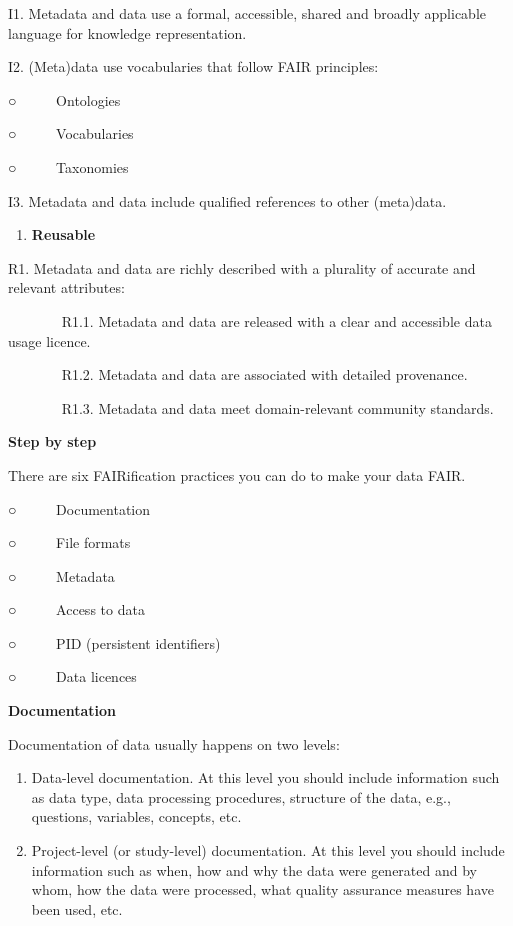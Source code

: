 \documentclass[
]{book}
\providecommand{\tightlist}{%
  \setlength{\itemsep}{0pt}\setlength{\parskip}{0pt}}
\begin{document}
I1. Metadata and data use a formal, accessible, shared and broadly applicable language for knowledge representation.

I2. (Meta)data use vocabularies that follow FAIR principles:

○ ~ ~ ~ Ontologies

○ ~ ~ ~ Vocabularies

○ ~ ~ ~ Taxonomies

I3. Metadata and data include qualified references to other (meta)data.

\begin{enumerate}
\def\labelenumi{\arabic{enumi}.}
\tightlist
\item
  \textbf{Reusable}
\end{enumerate}

R1. Metadata and data are richly described with a plurality of accurate and relevant attributes:

~ ~ ~ ~ ~R1.1. Metadata and data are released with a clear and accessible data usage licence.

~ ~ ~ ~ ~R1.2. Metadata and data are associated with detailed provenance.

~ ~ ~ ~ ~R1.3. Metadata and data meet domain-relevant community standards.

\textbf{Step by step}

There are six FAIRification practices you can do to make your data FAIR.

○ ~ ~ ~ Documentation

○ ~ ~ ~ File formats

○ ~ ~ ~ Metadata

○ ~ ~ ~ Access to data

○ ~ ~ ~ PID (persistent identifiers)

○ ~ ~ ~ Data licences

\textbf{Documentation}

Documentation of data usually happens on two levels:

\begin{enumerate}
\def\labelenumi{\arabic{enumi}.}
\tightlist
\item
  Data-level documentation. At this level you should include information such as data type, data processing procedures, structure of the data, e.g., questions, variables, concepts, etc.
\item
  Project-level (or study-level) documentation. At this level you should include information such as when, how and why the data were generated and by whom, how the data were processed, what quality assurance measures have been used, etc.
\end{enumerate}
\end{document}
